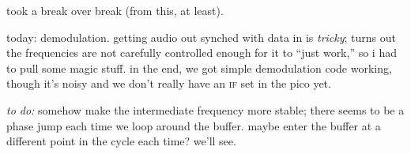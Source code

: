 took a break over break (from this, at least).

today: \am demodulation. getting audio out synched with data in is
\emph{tricky}; turns out the frequencies are not carefully controlled enough
for it to ``just work,'' so i had to pull some magic \dma stuff. in the end, we
got simple \am demodulation code working, though it's noisy and we don't really
have an \textsc{if} set in the pico yet.

\emph{to do:} somehow make the intermediate frequency more stable; there seems
to be a phase jump each time we loop around the buffer. maybe enter the buffer
at a different point in the cycle each time? we'll see.
